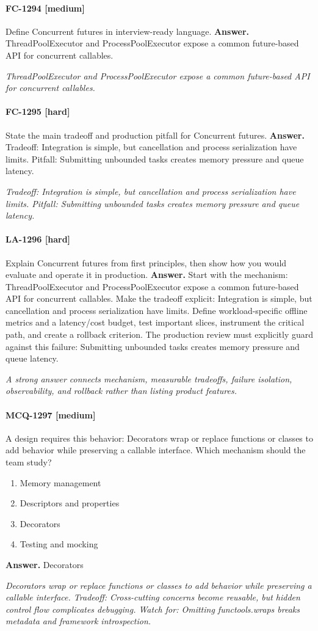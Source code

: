 \paragraph{FC-1294 [medium]} Define Concurrent futures in interview-ready language.
\noindent\textbf{Answer.} ThreadPoolExecutor and ProcessPoolExecutor expose a common future-based API for concurrent callables.
\par\textit{ThreadPoolExecutor and ProcessPoolExecutor expose a common future-based API for concurrent callables.}
\paragraph{FC-1295 [hard]} State the main tradeoff and production pitfall for Concurrent futures.
\noindent\textbf{Answer.} Tradeoff: Integration is simple, but cancellation and process serialization have limits. Pitfall: Submitting unbounded tasks creates memory pressure and queue latency.
\par\textit{Tradeoff: Integration is simple, but cancellation and process serialization have limits. Pitfall: Submitting unbounded tasks creates memory pressure and queue latency.}
\paragraph{LA-1296 [hard]} Explain Concurrent futures from first principles, then show how you would evaluate and operate it in production.
\noindent\textbf{Answer.} Start with the mechanism: ThreadPoolExecutor and ProcessPoolExecutor expose a common future-based API for concurrent callables. Make the tradeoff explicit: Integration is simple, but cancellation and process serialization have limits. Define workload-specific offline metrics and a latency/cost budget, test important slices, instrument the critical path, and create a rollback criterion. The production review must explicitly guard against this failure: Submitting unbounded tasks creates memory pressure and queue latency.
\par\textit{A strong answer connects mechanism, measurable tradeoffs, failure isolation, observability, and rollback rather than listing product features.}
\paragraph{MCQ-1297 [medium]} A design requires this behavior: Decorators wrap or replace functions or classes to add behavior while preserving a callable interface. Which mechanism should the team study?
\begin{enumerate}[label=\Alph*.]
\item Memory management
\item Descriptors and properties
\item Decorators
\item Testing and mocking
\end{enumerate}
\noindent\textbf{Answer.} Decorators
\par\textit{Decorators wrap or replace functions or classes to add behavior while preserving a callable interface. Tradeoff: Cross-cutting concerns become reusable, but hidden control flow complicates debugging. Watch for: Omitting functools.wraps breaks metadata and framework introspection.}
